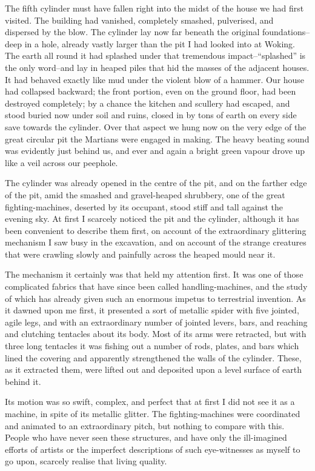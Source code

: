 The fifth cylinder must have fallen right into the midst of the
house we had first visited. The building had vanished, completely
smashed, pulverised, and dispersed by the blow. The cylinder lay
now far beneath the original foundations--deep in a hole, already
vastly larger than the pit I had looked into at Woking. The earth
all round it had splashed under that tremendous impact--``splashed''
is the only word--and lay in heaped piles that hid the masses of
the adjacent houses. It had behaved exactly like mud under the
violent blow of a hammer. Our house had collapsed backward; the
front portion, even on the ground floor, had been destroyed
completely; by a chance the kitchen and scullery had escaped, and
stood buried now under soil and ruins, closed in by tons of earth
on every side save towards the cylinder. Over that aspect we hung
now on the very edge of the great circular pit the Martians were
engaged in making. The heavy beating sound was evidently just
behind us, and ever and again a bright green vapour drove up like a
veil across our peephole.

The cylinder was already opened in the centre of the pit, and on
the farther edge of the pit, amid the smashed and gravel-heaped
shrubbery, one of the great fighting-machines, deserted by its
occupant, stood stiff and tall against the evening sky. At first I
scarcely noticed the pit and the cylinder, although it has been
convenient to describe them first, on account of the extraordinary
glittering mechanism I saw busy in the excavation, and on account
of the strange creatures that were crawling slowly and painfully
across the heaped mould near it.

The mechanism it certainly was that held my attention first. It was
one of those complicated fabrics that have since been called
handling-machines, and the study of which has already given such an
enormous impetus to terrestrial invention. As it dawned upon me
first, it presented a sort of metallic spider with five jointed,
agile legs, and with an extraordinary number of jointed levers,
bars, and reaching and clutching tentacles about its body. Most of
its arms were retracted, but with three long tentacles it was
fishing out a number of rods, plates, and bars which lined the
covering and apparently strengthened the walls of the cylinder.
These, as it extracted them, were lifted out and deposited upon a
level surface of earth behind it.

Its motion was so swift, complex, and perfect that at first I did
not see it as a machine, in spite of its metallic glitter. The
fighting-machines were coordinated and animated to an extraordinary
pitch, but nothing to compare with this. People who have never seen
these structures, and have only the ill-imagined efforts of artists
or the imperfect descriptions of such eye-witnesses as myself to go
upon, scarcely realise that living quality.

